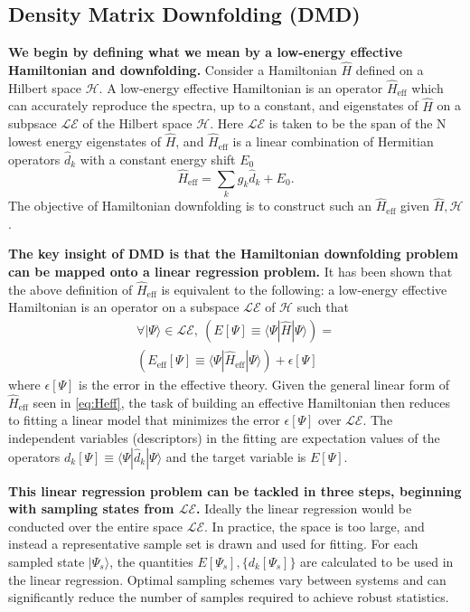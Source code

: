 \documentclass[12pt]{article}
\begin{document}
\subsection{Density Matrix Downfolding (DMD)}
\textbf{We begin by defining what we mean by a low-energy effective Hamiltonian and downfolding.}
Consider a Hamiltonian $\hat{H}$ defined on a Hilbert space $\mathcal{H}$.
A low-energy effective Hamiltonian is an operator $\hat{H}_\text{eff}$ which can accurately reproduce the spectra, up to a constant, and eigenstates of $\hat{H}$ on a subpsace $\mathcal{LE}$ of the Hilbert space $\mathcal{H}$.
Here $\mathcal{LE}$ is taken to be the span of the N lowest energy eigenstates of $\hat{H}$, and $\hat{H}_\text{eff}$ is a linear combination of Hermitian operators $\hat{d}_k$ with a constant energy shift $E_0$
\begin{equation}
\hat{H}_\text{eff} = \sum_{k} g_k \hat{d}_k  + E_0.
\label{eq:Heff}
\end{equation}
The objective of Hamiltonian downfolding is to construct such an $\hat{H}_\text{eff}$ given $\hat{H}, \mathcal{H}$.

\textbf{The key insight of DMD is that the Hamiltonian downfolding problem can be mapped onto a linear regression problem.}
It has been shown that the above definition of $\hat{H}_\text{eff}$ is equivalent to the following: a low-energy effective Hamiltonian is an operator on a subspace $\mathcal{LE}$ of $\mathcal{H}$ such that 
\begin{equation}
\begin{split}
\forall |\Psi\rangle \in \mathcal{LE},\ (E[\Psi] \equiv \langle \Psi|\hat{H} | \Psi \rangle)  = \\ (E_\text{eff}[\Psi] \equiv \langle \Psi | \hat{H}_\text{eff} | \Psi \rangle) + \epsilon[\Psi]
\end{split}
\label{eq:DMD}
\end{equation}
where $\epsilon[\Psi]$ is the error in the effective theory.
Given the general linear form of $\hat{H}_\text{eff}$ seen in \eqref{eq:Heff}, 
the task of building an effective Hamiltonian then reduces to fitting a linear model that minimizes the error $\epsilon[\Psi]$ over $\mathcal{LE}$.
The independent variables (descriptors) in the fitting are expectation values of the operators $d_k[\Psi] \equiv \langle \Psi |\hat{d}_k|\Psi \rangle$ and the target variable is $E[\Psi]$.

\textbf{This linear regression problem can be tackled in three steps, beginning with sampling states from $\mathcal{LE}$.}
Ideally the linear regression would be conducted over the entire space $\mathcal{LE}$. 
In practice, the space is too large, and instead a representative sample set is drawn and used for fitting.
For each sampled state $|\Psi_s\rangle$, the quantities $E[\Psi_s], \{d_k[\Psi_s]\}$ are calculated to be used in the linear regression.
Optimal sampling schemes vary between systems and can significantly reduce the number of samples required to achieve robust statistics.
\end{document}
